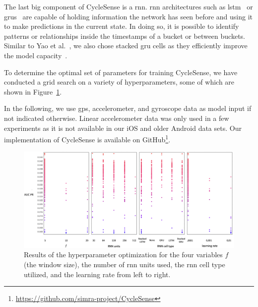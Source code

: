 The last big component of CycleSense is a \ac{rnn}.
\ac{rnn} architectures such as \ac{lstm}~\cite{hochreiter1997long} or \acp{gru}~\cite{chung2014empirical} are capable of holding information the network has seen before and using it to make predictions in the current state.
In doing so, it is possible to identify patterns or relationships inside the timestamps of a bucket or between buckets.
Similar to Yao et al.\ \cite{yao2017deepsense}, we also chose stacked \ac{gru} cells as they efficiently improve the model capacity~\cite{goodfellow2016deep}.

To determine the optimal set of parameters for training CycleSense, we have conducted a grid search on a variety of hyperparameters, some of which are shown in Figure~\ref{fig:hpo}.

In the following, we use \ac{gps}, accelerometer, and gyroscope data as model input if not indicated otherwise.
Linear accelerometer data was only used in a few experiments as it is not available in our iOS and older Android data sets.
Our implementation of CycleSense is available on GitHub\footnote{\url{https://github.com/simra-project/CycleSense}}.

\begin{figure}%
	\centering
	\includegraphics[width=\textwidth]{fig/hpo_results.png}
	\caption{Results of the hyperparameter optimization for the four variables $f$ (the window size), the number of \ac{rnn} units used, the \ac{rnn} cell type utilized, and the learning rate from left to right.}
	\label{fig:hpo}
\end{figure}

